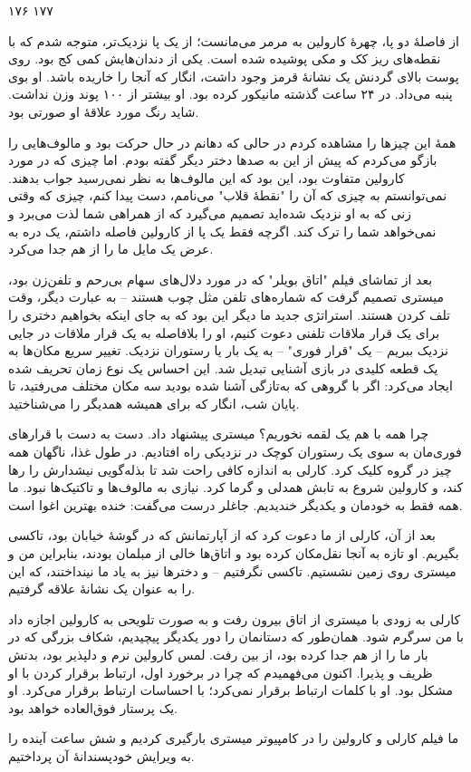 ۱۷۶ ۱۷۷

از فاصلهٔ دو پا، چهرهٔ کارولین به مرمر می‌مانست؛ از یک پا نزدیک‌تر، متوجه شدم که با نقطه‌های ریز کک و مکی پوشیده شده است. یکی از دندان‌هایش کمی کج بود. روی پوست بالای گردنش یک نشانهٔ قرمز وجود داشت، انگار که آنجا را خاریده باشد. او بوی پنبه می‌داد. در ۲۴ ساعت گذشته مانیکور کرده بود. او بیشتر از ۱۰۰ پوند وزن نداشت. شاید رنگ مورد علاقهٔ او صورتی بود.

همهٔ این چیزها را مشاهده کردم در حالی که دهانم در حال حرکت بود و مالوف‌هایی را بازگو می‌کردم که پیش از این به صدها دختر دیگر گفته بودم. اما چیزی که در مورد کارولین متفاوت بود، این بود که این مالوف‌ها به نظر نمی‌رسید جواب بدهند. نمی‌توانستم به چیزی که آن را "نقطهٔ قلاب" می‌نامم، دست پیدا کنم، چیزی که وقتی زنی که به او نزدیک شده‌اید تصمیم می‌گیرد که از همراهی شما لذت می‌برد و نمی‌خواهد شما را ترک کند. اگرچه فقط یک پا از کارولین فاصله داشتم، یک دره به عرض یک مایل ما را از هم جدا می‌کرد.

بعد از تماشای فیلم "اتاق بویلر" که در مورد دلال‌های سهام بی‌رحم و تلفن‌زن بود، میستری تصمیم گرفت که شماره‌های تلفن مثل چوب هستند – به عبارت دیگر، وقت تلف کردن هستند. استراتژی جدید ما دیگر این بود که به جای اینکه بخواهیم دختری را برای یک قرار ملاقات تلفنی دعوت کنیم، او را بلافاصله به یک قرار ملاقات در جایی نزدیک ببریم – یک "قرار فوری" – به یک بار یا رستوران نزدیک. تغییر سریع مکان‌ها به یک قطعه کلیدی در بازی آشنایی تبدیل شد. این احساس یک نوع زمان تحریف شده ایجاد می‌کرد: اگر با گروهی که به‌تازگی آشنا شده بودید سه مکان مختلف می‌رفتید، تا پایان شب، انگار که برای همیشه همدیگر را می‌شناختید.

چرا همه با هم یک لقمه نخوریم؟ میستری پیشنهاد داد. دست به دست با قرارهای فوری‌مان به سوی یک رستوران کوچک در نزدیکی راه افتادیم. در طول غذا، ناگهان همه چیز در گروه کلیک کرد. کارلی به اندازه کافی راحت شد تا بذله‌گویی نیشدارش را رها کند، و کارولین شروع به تابش همدلی و گرما کرد. نیازی به مالوف‌ها و تاکتیک‌ها نبود. ما همه فقط به خودمان و یکدیگر خندیدیم. جاغلر درست می‌گفت: خنده بهترین اغوا است.

بعد از آن، کارلی از ما دعوت کرد که از آپارتمانش که در گوشهٔ خیابان بود، تاکسی بگیریم. او تازه به آنجا نقل‌مکان کرده بود و اتاق‌ها خالی از مبلمان بودند، بنابراین من و میستری روی زمین نشستیم. تاکسی نگرفتیم – و دخترها نیز به یاد ما نینداختند، که این را به عنوان یک نشانهٔ علاقه گرفتیم.

کارلی به زودی با میستری از اتاق بیرون رفت و به صورت تلویحی به کارولین اجازه داد با من سرگرم شود. همان‌طور که دستانمان را دور یکدیگر پیچیدیم، شکاف بزرگی که در بار ما را از هم جدا کرده بود، از بین رفت. لمس کارولین نرم و دلپذیر بود، بدنش ظریف و پذیرا. اکنون می‌فهمیدم که چرا در برخورد اول، ارتباط برقرار کردن با او مشکل بود. او با کلمات ارتباط برقرار نمی‌کرد؛ با احساسات ارتباط برقرار می‌کرد. او یک پرستار فوق‌العاده‌ خواهد بود.

ما فیلم کارلی و کارولین را در کامپیوتر میستری بارگیری کردیم و شش ساعت آینده را به ویرایش خودپسندانهٔ آن پرداختیم.